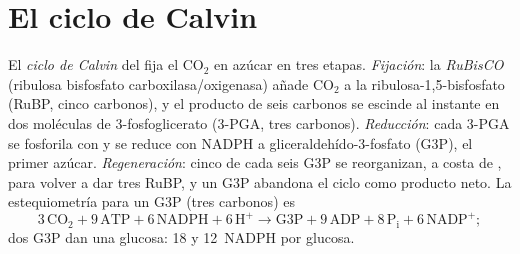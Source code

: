 \section{El ciclo de Calvin}

\begin{definition}\label{def:b1:photosynthesis:fixation}
El \emph{ciclo de Calvin} del  fija el $\mathrm{CO_2}$ en azúcar en
tres etapas. \emph{Fijación}: la \emph{RuBisCO} (ribulosa bisfosfato
carboxilasa/oxigenasa) añade $\mathrm{CO_2}$ a la ribulosa-1,5-bisfosfato
(RuBP, cinco carbonos), y el producto de seis carbonos se escinde al
instante en dos moléculas de 3-fosfoglicerato (3-PGA, tres carbonos).
\emph{Reducción}: cada 3-PGA se fosforila con  y se reduce con NADPH a
gliceraldehído-3-fosfato (G3P), el primer azúcar. \emph{Regeneración}: cinco
de cada seis G3P se reorganizan, a costa de , para volver a dar tres RuBP,
y un G3P abandona el ciclo como producto neto. La estequiometría para un G3P
(tres carbonos) es
\[
3\,\mathrm{CO_2} + 9\,\mathrm{ATP} + 6\,\mathrm{NADPH} + 6\,\mathrm{H^+}
\to \text{G3P} + 9\,\mathrm{ADP} + 8\,\mathrm{P_i} + 6\,\mathrm{NADP^+} ;
\]
dos G3P dan una glucosa: \qty{18}{}  y \qty{12}{NADPH} por glucosa.
\end{definition}

